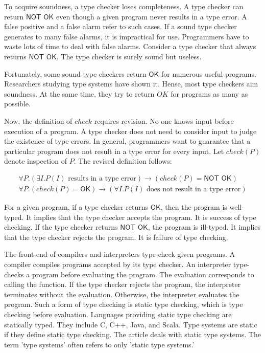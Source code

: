 To acquire soundness, a type checker loses completeness. A type checker can
return $\textsf{NOT OK}$ even though a given program never results in a type
error. A false positive and a false alarm refer to such cases. If a sound type
checker generates to many false alarms, it is impractical for use. Programmers
have to waste lots of time to deal with false alarms. Consider a type checker
that always returns $\textsf{NOT OK}$. The type checker is surely sound but
useless.

Fortunately, some sound type checkers return $\textsf{OK}$ for numerous useful
programs. Researchers studying type systems have shown it. Hense, most type
checkers aim soundness. At the same time, they try to return $OK$ for programs as
many as possible.

Now, the definition of $check$ requires revision. No one knows input before
execution of a program. A type checker does not need to consider input to judge
the existence of type errors. In general, programmers want to guarantee that a
particular program does not result in a type error for every input. Let
$check(P)$ denote inspection of $P$. The revised definition follows:

\[
\begin{array}{l}
\forall P.(\exists I.P(I)\text{ results in a type
error})\rightarrow(\mathit{check}(P)=\textsf{NOT OK}) \\
\forall P.(\mathit{check}(P)=\textsf{OK})\rightarrow(\forall I.P(I)\text{ does
not result in a type error})
\end{array}
\]

For a given program, if a type checker returns $\textsf{OK}$, then the program is
well-typed. It implies that the type checker accepts the program. It is success
of type checking. If the type checker returns $\textsf{NOT OK}$, the program is
ill-typed. It implies that the type checker rejects the program. It is failure of
type checking.

The front-end of compilers and interpreters type-check given programs. A compiler
compiles programs accepted by its type checker. An interpreter type-checks a
program before evaluating the program. The evaluation corresponds to calling the
 function. If the type checker rejects the program, the interpreter
terminates without the evaluation. Otherwise, the interpreter evaluates the
program. Such a form of type checking is static type checking, which is type
checking before evaluation. Languages providing static type checking are
statically typed. They include C, C++, Java, and Scala. Type systems are static
if they define static type checking. The article deals with static type systems.
The term 'type systems' often refers to only 'static type systems.'

